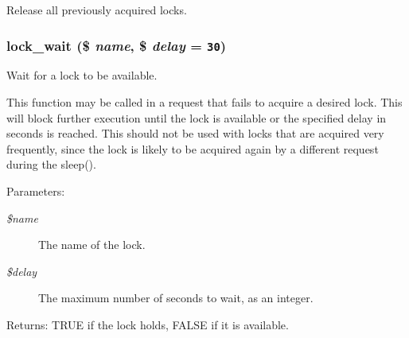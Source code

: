Release all previously acquired locks. \hypertarget{group__lock_g54c2ee771edac47614b8f12d949d3376}{
\subsubsection[{lock\_\-wait}]{\setlength{\rightskip}{0pt plus 5cm}lock\_\-wait (\$ {\em name}, \/  \$ {\em delay} = {\tt 30})}}
\label{group__lock_g54c2ee771edac47614b8f12d949d3376}


Wait for a lock to be available.

This function may be called in a request that fails to acquire a desired lock. This will block further execution until the lock is available or the specified delay in seconds is reached. This should not be used with locks that are acquired very frequently, since the lock is likely to be acquired again by a different request during the sleep().

\begin{Desc}
\item[Parameters:]
\begin{description}
\item[{\em \$name}]The name of the lock. \item[{\em \$delay}]The maximum number of seconds to wait, as an integer. \end{description}
\end{Desc}
\begin{Desc}
\item[Returns:]TRUE if the lock holds, FALSE if it is available. \end{Desc}
